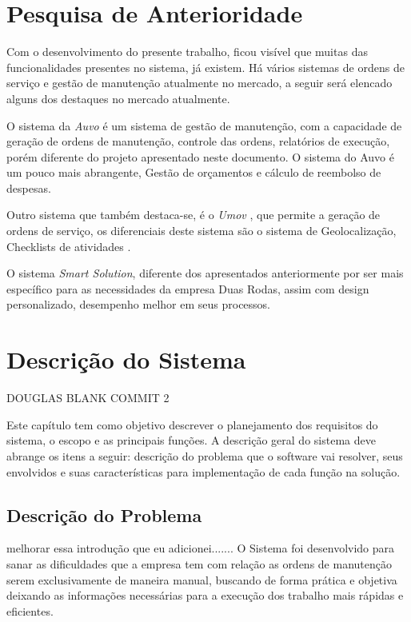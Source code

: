 \chapter{Pesquisa de Anterioridade}


Com o desenvolvimento do presente trabalho, ficou visível que muitas das funcionalidades presentes no sistema, já existem. Há vários sistemas de ordens de serviço e gestão de manutenção atualmente no mercado, a seguir será elencado alguns dos destaques no mercado atualmente.

O sistema da \textit{Auvo} é um sistema de gestão de manutenção, com a capacidade de geração de ordens de manutenção, controle das ordens, relatórios de execução, porém diferente do
projeto apresentado neste documento. O sistema do Auvo é um pouco mais abrangente,
Gestão de orçamentos e cálculo de reembolso de despesas.\cite{Auvo2019}

Outro sistema que também destaca-se, é o \textit{Umov} 
, que permite a geração de ordens de serviço,
os diferenciais deste sistema são o sistema de Geolocalização, Checklists de atividades \cite{umov2019}.

O sistema \textit{Smart Solution}, diferente dos apresentados anteriormente por ser mais específico para as
necessidades da empresa Duas Rodas, assim com design personalizado, desempenho melhor em seus processos.


\chapter{Descrição do Sistema }

DOUGLAS BLANK COMMIT 2

Este capítulo tem como objetivo descrever o planejamento dos requisitos  do sistema, o escopo e as principais funções. A descrição geral do sistema deve abrange os itens a seguir: descrição do problema que o software vai resolver, seus envolvidos e suas características para implementação de cada função na solução.



\section{Descrição do Problema}
 {\color{red} melhorar essa introdução que eu adicionei.......
 O  Sistema foi desenvolvido para sanar as dificuldades que a empresa tem com relação as ordens de manutenção serem exclusivamente de maneira manual, buscando de forma prática e objetiva deixando as informações necessárias para a execução dos trabalho mais rápidas e eficientes.}

